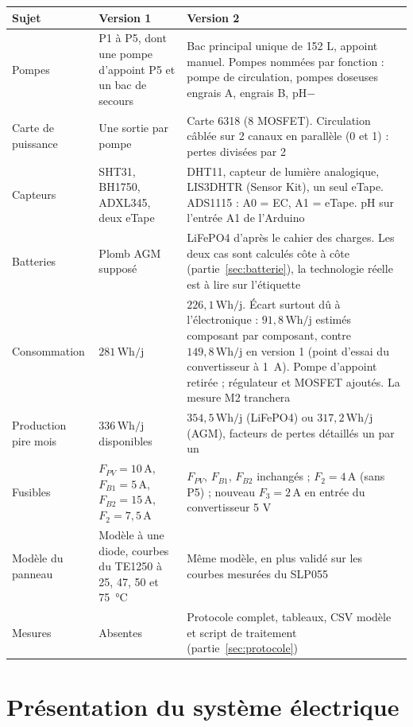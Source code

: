 \documentclass[11pt,a4paper]{article}
\newcommand{\U}[1]{\,\mathrm{#1}}
\begin{document}
\begin{center}
\begin{tabularx}{\linewidth}{>{\raggedright\arraybackslash}p{3.6cm} >{\raggedright\arraybackslash}X >{\raggedright\arraybackslash}X}
\toprule
\textbf{Sujet} & \textbf{Version 1} & \textbf{Version 2} \\
\midrule
Pompes & P1 à P5, dont une pompe d'appoint P5 et un bac de secours & Bac principal unique de 152 L, appoint manuel. Pompes nommées par fonction : pompe de circulation, pompes doseuses engrais A, engrais B, pH$-$ \\
Carte de puissance & Une sortie par pompe & Carte 6318 (8 MOSFET). Circulation câblée sur 2 canaux en parallèle (0 et 1) : pertes divisées par 2 \\
Capteurs & SHT31, BH1750, ADXL345, deux eTape & DHT11, capteur de lumière analogique, LIS3DHTR (Sensor Kit), un seul eTape. ADS1115 : A0 = EC, A1 = eTape. pH sur l'entrée A1 de l'Arduino \\
Batteries & Plomb AGM supposé & LiFePO4 d'après le cahier des charges. Les deux cas sont calculés côte à côte (partie~\ref{sec:batterie}), la technologie réelle est à lire sur l'étiquette \\
Consommation & $281\U{Wh/j}$ & $226{,}1\U{Wh/j}$. Écart surtout dû à l'électronique : $91{,}8\U{Wh/j}$ estimés composant par composant, contre $149{,}8\U{Wh/j}$ en version 1 (point d'essai du convertisseur à 1~A). Pompe d'appoint retirée ; régulateur et MOSFET ajoutés. La mesure M2 tranchera \\
Production pire mois & $336\U{Wh/j}$ disponibles & $354{,}5\U{Wh/j}$ (LiFePO4) ou $317{,}2\U{Wh/j}$ (AGM), facteurs de pertes détaillés un par un \\
Fusibles & $F_{PV} = 10\U{A}$, $F_{B1} = 5\U{A}$, $F_{B2} = 15\U{A}$, $F_2 = 7{,}5\U{A}$ & $F_{PV}$, $F_{B1}$, $F_{B2}$ inchangés ; $F_2 = 4\U{A}$ (sans P5) ; nouveau $F_3 = 2\U{A}$ en entrée du convertisseur 5 V \\
Modèle du panneau & Modèle à une diode, courbes du TE1250 à 25, 47, 50 et 75~°C & Même modèle, en plus validé sur les courbes mesurées du SLP055 \\
Mesures & Absentes & Protocole complet, tableaux, CSV modèle et script de traitement (partie~\ref{sec:protocole}) \\
\bottomrule
\end{tabularx}
\end{center}

\newpage
\section{Présentation du système électrique}
\end{document}
